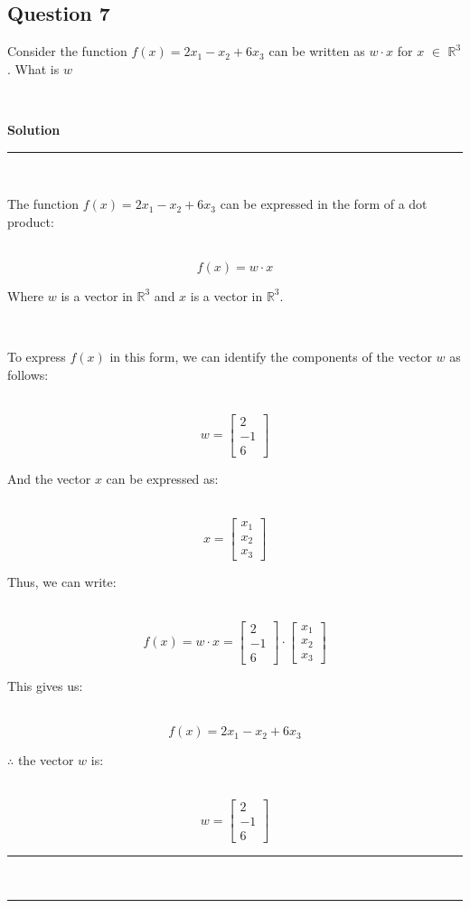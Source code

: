 \documentclass{article}
\begin{document}
\subsection*{Question 7}
\parbox{\textwidth}{Consider the function $f(x) = 2x_1 -x_2+6x_3$ can be written as $w \cdot x$ for $x$ $\in$ $\mathbb{R}^3$. What is $w$}\\
\parbox{\textwidth}{\textbf{Solution}}
\noindent\rule{\textwidth}{0.4pt}\\
\parbox{\textwidth}{The function $f(x) = 2x_1 - x_2 + 6x_3$ can be expressed in the form of a dot product:}\\
$$f(x) = w \cdot x$$
\parbox{\textwidth}{Where $w$ is a vector in $\mathbb{R}^3$ and $x$ is a vector in $\mathbb{R}^3$.}\\
\parbox{\textwidth}{To express $f(x)$ in this form, we can identify the components of the vector $w$ as follows:}\\
$$w = \begin{bmatrix} 2 \\ -1 \\ 6 \end{bmatrix}$$
\parbox{\textwidth}{And the vector $x$ can be expressed as:}\\
$$x = \begin{bmatrix} x_1 \\ x_2 \\ x_3 \end{bmatrix}$$
\parbox{\textwidth}{Thus, we can write:}\\
$$f(x) = w \cdot x = \begin{bmatrix} 2 \\ -1 \\ 6 \end{bmatrix} \cdot \begin{bmatrix} x_1 \\ x_2 \\ x_3 \end{bmatrix}$$
\parbox{\textwidth}{This gives us:}\\
$$f(x) = 2x_1 - x_2 + 6x_3$$
\parbox{\textwidth}{$\therefore$ the vector $w$ is:}\\
$$w = \begin{bmatrix} 2 \\ -1 \\ 6 \end{bmatrix}$$
\noindent\rule{\textwidth}{0.4pt}\\
\noindent\rule{\textwidth}{0.4pt}\\
\end{document}
